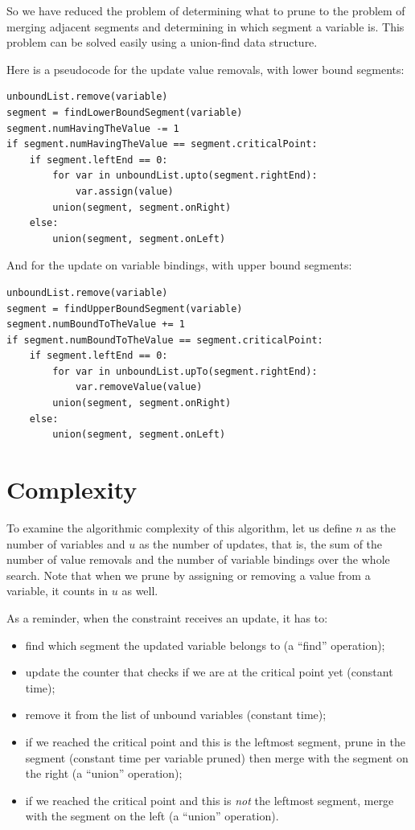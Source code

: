\documentclass[a4paper,10pt]{article}
\begin{document}
So we have reduced the problem of determining what to prune to the problem of merging adjacent segments and determining in which segment a variable is. This problem can be solved easily using a union-find data structure.

Here is a pseudocode for the update value removals, with lower bound segments:
\begin{lstlisting}
unboundList.remove(variable)
segment = findLowerBoundSegment(variable)
segment.numHavingTheValue -= 1
if segment.numHavingTheValue == segment.criticalPoint:
    if segment.leftEnd == 0:
        for var in unboundList.upto(segment.rightEnd):
            var.assign(value)
        union(segment, segment.onRight)
    else:
        union(segment, segment.onLeft)
\end{lstlisting}

And for the update on variable bindings, with upper bound segments:
\begin{lstlisting}
unboundList.remove(variable)
segment = findUpperBoundSegment(variable)
segment.numBoundToTheValue += 1
if segment.numBoundToTheValue == segment.criticalPoint:
    if segment.leftEnd == 0:
        for var in unboundList.upTo(segment.rightEnd):
            var.removeValue(value)
        union(segment, segment.onRight)
    else:
        union(segment, segment.onLeft)
\end{lstlisting}

\section{Complexity}

To examine the algorithmic complexity of this algorithm, let us define $n$ as the number of variables and $u$ as the number of updates, that is, the sum of the number of value removals and the number of variable bindings over the whole search. Note that when we prune by assigning or removing a value from a variable, it counts in $u$ as well.

As a reminder, when the constraint receives an update, it has to:
\begin{itemize}
    \item find which segment the updated variable belongs to (a ``find'' operation);
    \item update the counter that checks if we are at the critical point yet (constant time);
    \item remove it from the list of unbound variables (constant time);
    \item if we reached the critical point and this is the leftmost segment, prune in the segment (constant time per variable pruned) then merge with the segment on the right (a ``union'' operation);
    \item if we reached the critical point and this is \emph{not} the leftmost segment, merge with the segment on the left (a ``union'' operation).
\end{itemize}
\end{document}
